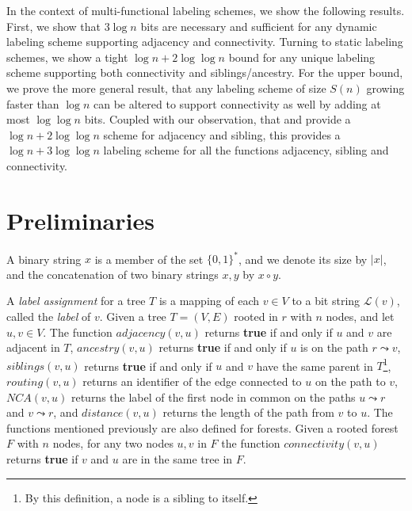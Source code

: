 \documentclass{llncs}
\newcommand{\la}{\ensuremath{ \mathcal{L}}}
\newcommand{\sd}[1]{{#1}}
\newcommand{\drop}[1]{}
\begin{document}
In the context of multi-functional labeling schemes, we show the following
results. First, we show that $3 \log n$ bits are necessary and sufficient for
any dynamic labeling scheme supporting adjacency and connectivity. Turning to
static labeling schemes, we show a tight $\log n + 2 \log \log n$ bound for
any unique labeling scheme supporting both connectivity and siblings/ancestry.
\sd{For the upper bound, we prove the more general result, that}
\drop{In order to show the upper bound, we prove that} any labeling scheme of size
$S(n)$ growing faster than $\log n$ can be altered to support connectivity as well by adding at most $\log\log n$ bits.
\sd{Coupled with our observation, that \cite{Alstrup02} and \cite{Alstrup05}
provide a $\log n + 2\log\log n$ scheme for adjacency and sibling, this
provides a $\log n + 3\log\log n$ labeling scheme for all the functions
adjacency, sibling and connectivity.}
\section{Preliminaries}
A binary string $x$ is a member of the set $\{0,1\}^*$, and we denote its size by $\vert x \vert$, and the concatenation of two binary strings $x,y$ by $ x \circ y$.

A \emph{label assignment}  for a tree $T$ is a mapping of each $v \in V$
	to a bit  string $\la(v)$, called  the \emph{label} of $v$.
Given  a tree $T=(V,E) $ rooted in $r$ with $n$ nodes, and let $u,v \in V$.
	The function $adjacency(v,u)$ returns \textbf{true} if and only if $u$ and $v$ are adjacent in $T$,
	$ancestry(v,u)$   returns \textbf{true} if and only if $u$ is on the path $r \leadsto v$,
	$siblings(v,u)$   returns \textbf{true} if and only if $u$ and $v$ have the same parent in $T$\footnote{By this definition, a node is a sibling to itself.},
	$routing(v,u)$   returns an identifier  of the edge connected to  $u$ on the path to  $v$,
	$NCA (v,u)$   returns the label of the first node in common on the paths $u \leadsto r$ and $v \leadsto r$,
	and $distance (v,u)$ returns the length of the path from $v$ to $u$.
	The functions mentioned previously are also defined for forests.
	Given a rooted forest $F$ with $n$ nodes, for any two nodes $u,v$ in $F$ the function  $connectivity(v,u)$ returns  \textbf{true}  if $v$ and $u$ are in the same tree in $F$.
\end{document}
